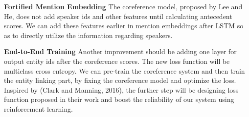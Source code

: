 \documentclass[11pt]{article}
\begin{document}
{\bf Fortified Mention Embedding} 
The coreference model, proposed by Lee and He, does not add speaker ids and other features until calculating antecedent scores. We can add these features earlier in mention embeddings after LSTM so as to directly utilize the information regarding speakers.   

{\bf End-to-End Training}
Another improvement should be adding one layer for output entity ids after the coreference scores. The new loss function will be multiclass cross entropy. We can pre-train the coreference system and then train the entity linking part, by fixing the coreference model and optimize the loss. Inspired by (Clark and Manning, 2016), the further step will be designing loss function proposed in their work and boost the reliability of our system using reinforcement learning.







\appendix
\end{document}
